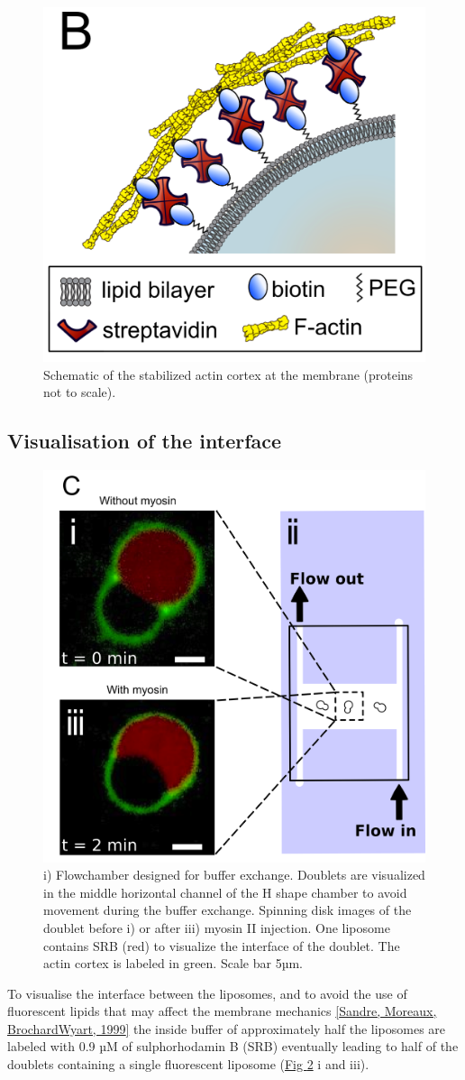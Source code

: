 \documentclass[A4paperpaper,11pt,english]{sphinxmanual}
\begin{document}
\begin{figure}[htbp]
\centering
\capstart

\includegraphics[width=0.500\linewidth]{Fig_01-B.png}
\caption{Schematic of the stabilized actin cortex at the membrane (proteins not to scale).}\label{parts/part4:fig1b}\end{figure}


\subsection{Visualisation of the interface}
\label{parts/part4:visualisation-of-the-interface}\begin{figure}[htbp]
\centering
\capstart

\includegraphics[width=0.500\linewidth]{Fig_01-C.png}
\caption{i) Flowchamber designed for buffer exchange. Doublets
are visualized in the middle horizontal channel of the H shape chamber to
avoid movement during the buffer exchange. Spinning disk images of the
doublet before i) or after iii) myosin II injection. One liposome contains
SRB (red) to visualize the interface of the doublet. The actin cortex is
labeled in green. Scale bar 5µm.}\label{parts/part4:fig1c}\end{figure}

To visualise the interface between the liposomes, and to avoid the use of fluorescent
lipids that may affect the membrane mechanics {\hyperref[parts/part4:sandre1999]{{[}Sandre, Moreaux, BrochardWyart,  1999{]}}} the inside
buffer of approximately half the liposomes are labeled with 0.9 µM
of sulphorhodamin B (SRB)
eventually leading to half of the doublets containing a single fluorescent liposome (\hyperref[parts/part4:fig1c]{Fig  \ref*{parts/part4:fig1c}} i and iii).
\end{document}

